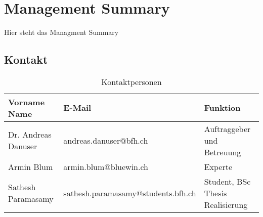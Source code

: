 \chapter*{Management Summary}
\label{chap:vorwort}

Hier steht das Managment Summary

\section*{Kontakt}
\label{sec:vorwort_kontakt}

\begin{table}[H]
	\begin{tabular}{lll} \toprule
		\textbf{Vorname Name} & \textbf{E-Mail} & \textbf{Funktion} \\ \midrule
		Dr. Andreas Danuser & andreas.danuser@bfh.ch & Auftraggeber und Betreuung\\ \midrule
		Armin Blum & armin.blum@bluewin.ch & Experte\\ \midrule
		Sathesh Paramasamy & sathesh.paramasamy@students.bfh.ch & Student, BSc Thesis Realisierung \\ \bottomrule
	\end{tabular}
	\caption*{Kontaktpersonen}
	\label{tab:kontaktpersonen}
\end{table}

